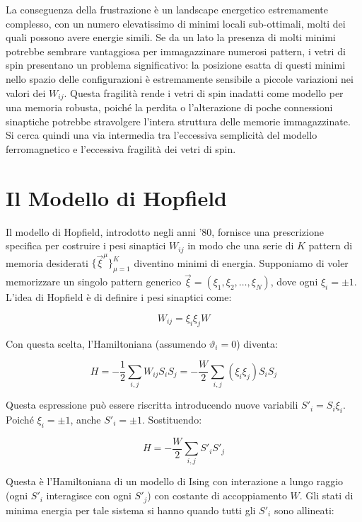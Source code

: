 La conseguenza della frustrazione è un landscape energetico estremamente complesso, con un numero elevatissimo di minimi locali sub-ottimali, molti dei quali possono avere energie simili.
Se da un lato la presenza di molti minimi potrebbe sembrare vantaggiosa per immagazzinare numerosi pattern, i vetri di spin presentano un problema significativo: la posizione esatta di questi minimi nello spazio delle configurazioni è estremamente sensibile a piccole variazioni nei valori dei $W_{ij}$. Questa fragilità rende i vetri di spin inadatti come modello per una memoria robusta, poiché la perdita o l'alterazione di poche connessioni sinaptiche potrebbe stravolgere l'intera struttura delle memorie immagazzinate.
Si cerca quindi una via intermedia tra l'eccessiva semplicità del modello ferromagnetico e l'eccessiva fragilità dei vetri di spin.


\section{Il Modello di Hopfield}
Il modello di Hopfield, introdotto negli anni '80, fornisce una prescrizione specifica per costruire i pesi sinaptici $W_{ij}$ in modo che una serie di $K$ pattern di memoria desiderati $\{\vec{\xi}^\mu\}_{\mu=1}^K$ diventino minimi di energia.
Supponiamo di voler memorizzare un singolo pattern generico $\vec{\xi} = (\xi_1, \xi_2, \dots, \xi_N)$, dove ogni $\xi_i = \pm 1$.
L'idea di Hopfield è di definire i pesi sinaptici come:

\begin{equation} \label{eq:ch21_17}
W_{ij} =  \xi_i \xi_j W
\end{equation}

Con questa scelta, l'Hamiltoniana (assumendo $\vartheta_i=0$) diventa:

\begin{equation} \label{eq:ch21_18}
H = -\frac{1}{2} \sum_{i, j} W_{ij}S_iS_j = -\frac{W}{2} \sum_{i,j} (\xi_i \xi_j) S_i S_j
\end{equation}

Questa espressione può essere riscritta introducendo nuove variabili $S'_i = S_i \xi_i$.
Poiché $\xi_i = \pm 1$, anche $S'_i = \pm 1$.
Sostituendo:

\begin{equation} \label{eq:ch21_19}
H = -\frac{W}{2}\sum_{i,j} S'_i S'_j
\end{equation}

Questa è l'Hamiltoniana di un modello di Ising con interazione a lungo raggio (ogni $S'_i$ interagisce con ogni $S'_j$) con costante di accoppiamento $W$.
Gli stati di minima energia per tale sistema si hanno quando tutti gli $S'_i$ sono allineati:

